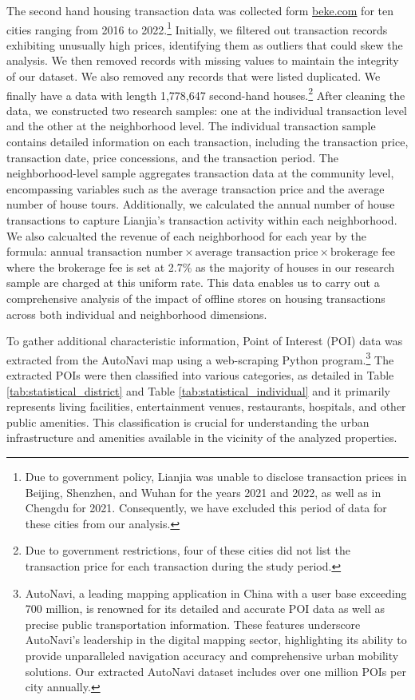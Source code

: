 \documentclass[11pt]{article}
\begin{document}
The second hand housing transaction data was collected form \href{https://www.ke.com/city/}{beke.com} for ten cities ranging from 2016 to 2022.\footnote{Due to government policy, Lianjia was unable to disclose transaction prices in Beijing, Shenzhen, and Wuhan for the years 2021 and 2022, as well as in Chengdu for 2021. Consequently, we have excluded this period of data for these cities from our analysis.} Initially, we filtered out transaction records exhibiting unusually high prices, identifying them as outliers that could skew the analysis. We then removed records with missing values to maintain the integrity of our dataset. We also removed any records that were listed duplicated. We finally have a data with length 1,778,647 second-hand houses.\footnote{Due to government restrictions, four of these cities did not list the transaction price for each transaction during the study period.} After cleaning the data, we constructed two research samples: one at the individual transaction level and the other at the neighborhood level. The individual transaction sample contains detailed information on each transaction, including the transaction price, transaction date, price concessions, and the transaction period. The neighborhood-level sample aggregates transaction data at the community level, encompassing variables such as the average transaction price and the average number of house tours. Additionally, we calculated the annual number of house transactions to capture Lianjia's transaction activity within each neighborhood. We also calcualted the revenue of each neighborhood for each year by the formula: $\text{annual transaction number} \times \text{average transaction price} \times \text{brokerage fee}$ where the brokerage fee is set at 2.7\% as the majority of houses in our research sample are charged at this uniform rate. This data enables us to carry out a comprehensive analysis of the impact of offline stores on housing transactions across both individual and neighborhood dimensions.

To gather additional characteristic information, Point of Interest (POI) data was extracted from the AutoNavi map using a web-scraping Python program.\footnote{AutoNavi, a leading mapping application in China with a user base exceeding 700 million, is renowned for its detailed and accurate POI data as well as precise public transportation information. These features underscore AutoNavi's leadership in the digital mapping sector, highlighting its ability to provide unparalleled navigation accuracy and comprehensive urban mobility solutions. Our extracted AutoNavi dataset includes over one million POIs per city annually.} The extracted POIs were then classified into various categories, as detailed in Table \ref{tab:statistical_district} and Table \ref{tab:statistical_individual} and it primarily represents living facilities, entertainment venues, restaurants, hospitals, and other public amenities. This classification is crucial for understanding the urban infrastructure and amenities available in the vicinity of the analyzed properties.
\end{document}

